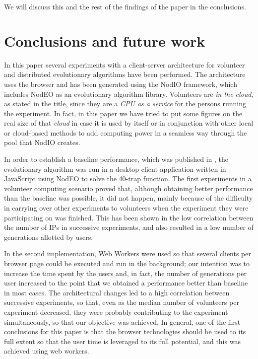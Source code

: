 \documentclass{sig-alternate}
\begin{document}
We will discuss this and the rest of the findings of the paper in the
conclusions. 

\section{Conclusions and future work}
\label{sec:conclusion}

In this paper several experiments with a client-server architecture for volunteer and distributed
evolutionary algorithms have been performed. The architecture uses the
browser and has been generated using the {\sf
  NodIO} framework, which includes  {\sf NodEO} as an evolutionary
algorithm library. Volunteers are {\em in the cloud}, as stated in the
title, 
since they are a {\em CPU as a service} for the persons running the
experiment. In fact, in this paper we have tried to put some figures
on the real size of that {\em cloud} in case it is used by itself or
in conjunction with other local or 
cloud-based methods to add computing power in a seamless way through
the pool that {\sf NodIO} creates. 

In order to establish a baseline performance, which was published in
\cite{2016arXiv160101607Manom}, the evolutionary algorithm was run in a desktop client application written in JavaScript
using NodEO to solve the 40-trap function. The first experiments in a
volunteer computing scenario proved that, although obtaining better performance than the
baseline  was possible, it did not happen, mainly because of the
difficulty in carrying over other experiments to volunteers when the
experiment they were participating on was finished. This has been shown in the low
correlation between the number of IPs in successive experiments, and
also resulted in a low number of generations allotted by users.  

In the second implementation, Web Workers
were used so that several clients per browser page could be executed and
run in the background; our intention was to increase the time spent by
the users and, in fact, the number of generations per
user increased to the point that we obtained a performance better than
baseline in most cases. The architectural changes led to a high correlation
between successive experiments, so that, even as the median number of
volunteers per experiment decreased, they were probably contributing
to the experiment simultaneously, so that our objective was
achieved. In general, one of the first conclusions for this paper is
that the browser technologies should be used to its full extent so
that the user time is leveraged to its full potential, and this was
achieved using web workers. 
\end{document}
